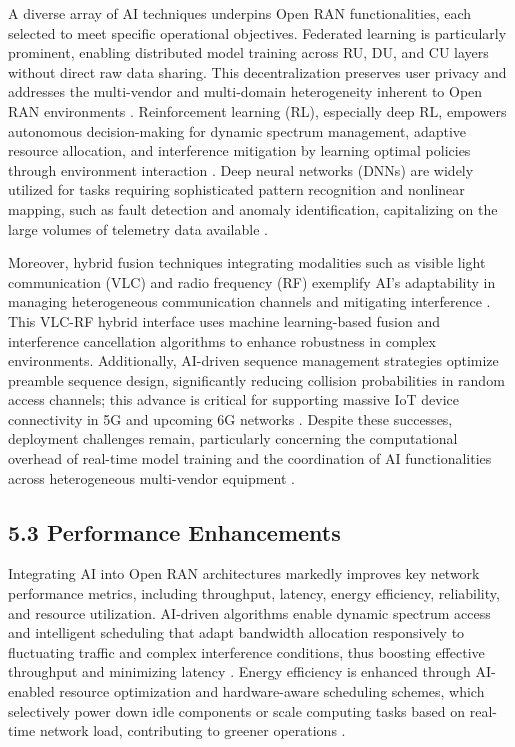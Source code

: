 \documentclass[11pt]{article}
\begin{document}
\begin{itemize}
A diverse array of AI techniques underpins Open RAN functionalities, each selected to meet specific operational objectives. Federated learning is particularly prominent, enabling distributed model training across RU, DU, and CU layers without direct raw data sharing. This decentralization preserves user privacy and addresses the multi-vendor and multi-domain heterogeneity inherent to Open RAN environments \cite{ref54}. Reinforcement learning (RL), especially deep RL, empowers autonomous decision-making for dynamic spectrum management, adaptive resource allocation, and interference mitigation by learning optimal policies through environment interaction \cite{ref21,ref22}. Deep neural networks (DNNs) are widely utilized for tasks requiring sophisticated pattern recognition and nonlinear mapping, such as fault detection and anomaly identification, capitalizing on the large volumes of telemetry data available \cite{ref23,ref24}.

Moreover, hybrid fusion techniques integrating modalities such as visible light communication (VLC) and radio frequency (RF) exemplify AI’s adaptability in managing heterogeneous communication channels and mitigating interference \cite{ref25}. This VLC-RF hybrid interface uses machine learning-based fusion and interference cancellation algorithms to enhance robustness in complex environments. Additionally, AI-driven sequence management strategies optimize preamble sequence design, significantly reducing collision probabilities in random access channels; this advance is critical for supporting massive IoT device connectivity in 5G and upcoming 6G networks \cite{ref21}. Despite these successes, deployment challenges remain, particularly concerning the computational overhead of real-time model training and the coordination of AI functionalities across heterogeneous multi-vendor equipment \cite{ref49}.

\subsection{5.3 Performance Enhancements}

Integrating AI into Open RAN architectures markedly improves key network performance metrics, including throughput, latency, energy efficiency, reliability, and resource utilization. AI-driven algorithms enable dynamic spectrum access and intelligent scheduling that adapt bandwidth allocation responsively to fluctuating traffic and complex interference conditions, thus boosting effective throughput and minimizing latency \cite{ref54}. Energy efficiency is enhanced through AI-enabled resource optimization and hardware-aware scheduling schemes, which selectively power down idle components or scale computing tasks based on real-time network load, contributing to greener operations \cite{ref49}.


\end{itemize}
\end{document}
